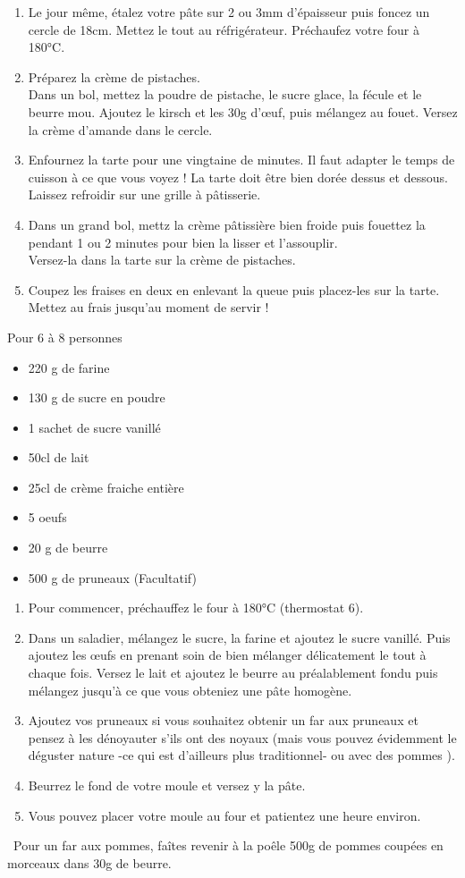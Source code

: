{\begin{enumerate}
\item Le jour même, étalez votre pâte sur 2 ou 3mm d'épaisseur puis foncez un cercle de 18cm. Mettez le tout au réfrigérateur. Préchaufez votre four à 180°C.
\item Préparez la crème de pistaches. \\
Dans un bol, mettez la poudre de pistache, le sucre glace, la fécule et le beurre mou. Ajoutez le kirsch et les 30g d'\oe uf, puis mélangez au fouet. Versez la crème d'amande dans le cercle.
\item Enfournez la tarte pour une vingtaine de minutes. Il faut adapter le temps de cuisson à ce que vous voyez ! La tarte doit être bien dorée dessus et dessous. Laissez refroidir sur une grille à pâtisserie.
\item Dans un grand bol, mettz la crème pâtissière bien froide puis fouettez la pendant 1 ou 2 minutes pour bien la lisser et l'assouplir.\\
Versez-la dans la tarte sur la crème de pistaches.
\item Coupez les fraises en deux en enlevant la queue puis placez-les sur la tarte. Mettez au frais jusqu'au moment de servir !
\end{enumerate}}

\medskip
{}
{Pour 6 à 8 personnes}{\begin{itemize}
\item 220 g de farine
\item 130 g de sucre en poudre
\item 1 sachet de sucre vanillé
\item 50cl de lait
\item 25cl de crème fraiche entière
\item 5 oeufs
\item 20 g de beurre
\item 500 g de pruneaux (Facultatif)
\end{itemize}}
{\begin{enumerate}
\item Pour commencer, préchauffez le four à 180°C (thermostat 6).
\item Dans un saladier, mélangez le sucre, la farine et ajoutez le sucre vanillé. Puis ajoutez les œufs en prenant soin de bien mélanger délicatement le tout à chaque fois. Versez le lait et ajoutez le beurre au préalablement fondu puis mélangez jusqu'à ce que vous obteniez une pâte homogène.
\item Ajoutez vos pruneaux si vous souhaitez obtenir un far aux pruneaux et pensez à les dénoyauter s'ils ont des noyaux (mais vous pouvez évidemment le déguster nature -ce qui est d'ailleurs plus traditionnel- ou avec des pommes \bcinfo).
\item Beurrez le fond de votre moule et versez y la pâte.
\item Vous pouvez placer votre moule au four et patientez une heure environ.
\end{enumerate}
\bcinfo\ Pour un far aux pommes, faîtes revenir à la poêle 500g de pommes coupées en morceaux dans 30g de beurre.}

